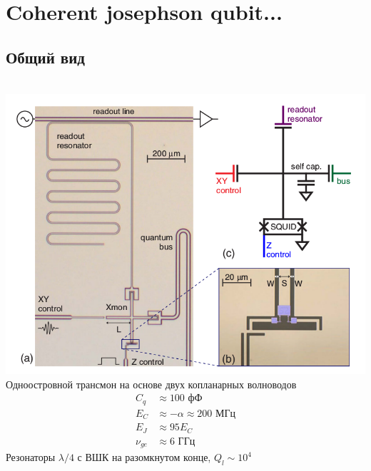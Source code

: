 \documentclass[aspectratio=169, 13pt, t]{beamer}
\begin{document}
\section{Coherent josephson qubit...}
\subsection{Общий вид}
\begin{frame}[t]\frametitle{\secname}\framesubtitle{\subsecname}

\begin{columns}[c]
\centering
\includegraphics[width=\textwidth]{xmon}
Одноостровной трансмон на основе двух копланарных волноводов
\begingroup
\setlength{\abovedisplayskip}{0pt} \setlength{\abovedisplayshortskip}{0pt}
\setlength{\belowdisplayskip}{0pt} \setlength{\belowdisplayshortskip}{0pt}
\begin{align*}
C_q &\approx 100 \text{ фФ}\\
E_C &\approx -\alpha \approx 200 \text{ МГц}\\
E_J &\approx 95 E_C\\
\nu_{ge} &\approx 6 \text{ ГГц}
\end{align*}
\endgroup
Резонаторы $\lambda/4$ с ВШК на разомкнутом конце, $Q_l \sim 10^4$
\end{columns}

\end{frame}
\end{document}
